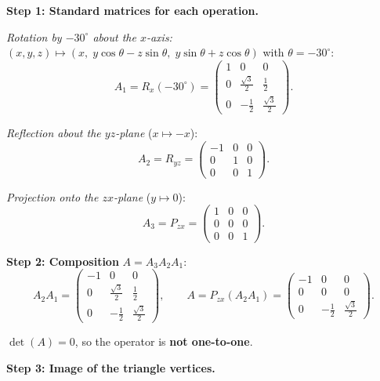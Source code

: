 \documentclass[12pt,a3paper]{article}
\begin{document}
\begin{tcolorbox}[enhanced,breakable,
  colback=cF!4,colframe=cF,boxrule=0.8pt,arc=5pt,
  title={\textbf{Answer --- Composition: Rot$(-30^\circ,x)$ $\to$ Reflect$(yz)$ $\to$ Project$(zx)$; Triangle Image}},
  fonttitle=\bfseries\color{white},colbacktitle=cF]

\textbf{Step 1: Standard matrices for each operation.}

\textit{Rotation by $-30^\circ$ about the $x$-axis:}
$(x,y,z)\mapsto(x,\;y\cos\theta-z\sin\theta,\;y\sin\theta+z\cos\theta)$ with $\theta=-30^\circ$:
\[
A_1=R_x(-30^\circ)=\begin{pmatrix}1&0&0\\0&\frac{\sqrt{3}}{2}&\frac{1}{2}\\0&-\frac{1}{2}&\frac{\sqrt{3}}{2}\end{pmatrix}.
\]

\textit{Reflection about the $yz$-plane} ($x\mapsto-x$):
\[
A_2=R_{yz}=\begin{pmatrix}-1&0&0\\0&1&0\\0&0&1\end{pmatrix}.
\]

\textit{Projection onto the $zx$-plane} ($y\mapsto 0$):
\[
A_3=P_{zx}=\begin{pmatrix}1&0&0\\0&0&0\\0&0&1\end{pmatrix}.
\]

\textbf{Step 2: Composition} $A=A_3A_2A_1$:
\[
A_2A_1=\begin{pmatrix}-1&0&0\\0&\frac{\sqrt{3}}{2}&\frac{1}{2}\\0&-\frac{1}{2}&\frac{\sqrt{3}}{2}\end{pmatrix},
\qquad
A=P_{zx}(A_2A_1)=\boxed{\begin{pmatrix}-1&0&0\\0&0&0\\0&-\frac{1}{2}&\frac{\sqrt{3}}{2}\end{pmatrix}}.
\]

$\det(A)=0$, so the operator is \textbf{not one-to-one}.

\textbf{Step 3: Image of the triangle vertices.}


\end{tcolorbox}
\end{document}

